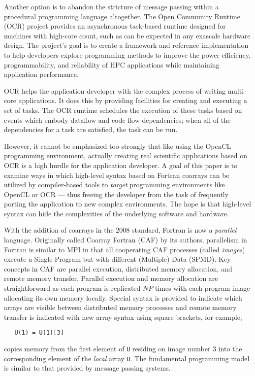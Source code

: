 Another option is to abandon the stricture of message passing within a procedural
programming language altogether.  The Open Community Runtime (OCR)
project\cite{OCR:wiki:url} provides an asynchronous task-based runtime designed for
machines with high-core count\cite{Dokulil20151453}, such as can be expected in any
exascale hardware design.  The project's goal is to create a framework and reference
implementation to help developers explore programming methods to improve the power
efficiency, programmability, and reliability of HPC applications while maintaining
application performance.

OCR helps the application developer with the complex process of writing multi-core
applications.  It does this by providing facilities for creating and executing a set of
tasks.  The OCR runtime schedules the execution of these tasks based on events which
embody dataflow and code flow dependencies; when all of the dependencies for a task are
satisfied, the task can be run.

However, it cannot be emphasized too strongly that like using the OpenCL programming
environment, actually creating real scientific applications based on OCR is a high hurdle
for the application developer.  A goal of this paper is to examine ways in
which high-level syntax based on Fortran coarrays can be utilized by compiler-based tools
to \emph{target} programming environments like OpenCL or OCR --- thus freeing the developer from
the task of frequently porting the application to new complex environments.  The hope is
that high-level syntax can hide the complexities of the underlying software and hardware.

With the addition of coarrays in the 2008 standard, Fortran is now a \emph{parallel}
language.  Originally called Coarray Fortran (CAF) by its
authors\cite{Numrich:1998:CFP:289918.289920}, parallelism in Fortran is similar to MPI in
that all cooperating CAF processes (called \emph{images}) execute a Single Program but with
different (Multiple) Data (SPMD).  Key concepts in CAF are parallel execution, distributed
memory allocation, and remote memory transfer.  Parallel execution and memory allocation
are straightforward as each program is replicated $NP$ times with each program image
allocating its own memory locally.  Special syntax is provided to indicate which arrays
are visible between distributed memory processes and remote memory transfer is indicated
with new array syntax using square brackets, for example,
\begin{verbatim}
   U(1) = U(1)[3]
\end{verbatim}
copies memory from the first element of \texttt{U} residing on image number 3 into
the corresponding element of the \emph{local} array \texttt{U}.  The fundamental programming
model is similar to that provided by message passing systems.

